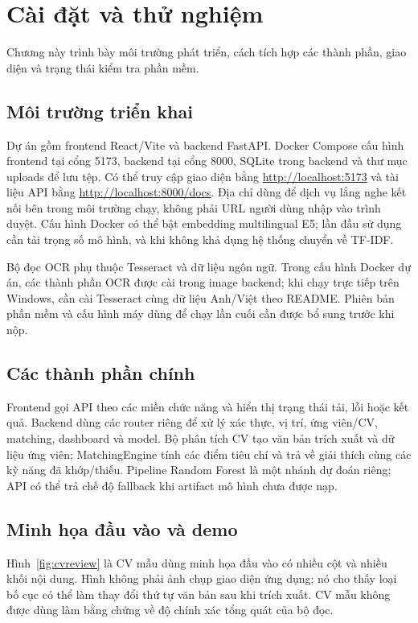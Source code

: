 \chapter{Cài đặt và thử nghiệm}
\label{ch:caidat}

\begin{muctieu}
Chương này trình bày môi trường phát triển, cách tích hợp các thành phần, giao diện và trạng thái kiểm tra phần mềm.
\end{muctieu}

\section{Môi trường triển khai}
Dự án gồm frontend React/Vite và backend FastAPI. Docker Compose cấu hình frontend tại cổng 5173, backend tại cổng 8000, SQLite trong backend và thư mục uploads để lưu tệp. Có thể truy cập giao diện bằng \url{http://localhost:5173} và tài liệu API bằng \url{http://localhost:8000/docs}. Địa chỉ  dùng để dịch vụ lắng nghe kết nối bên trong môi trường chạy, không phải URL người dùng nhập vào trình duyệt. Cấu hình Docker có thể bật embedding multilingual E5; lần đầu sử dụng cần tải trọng số mô hình, và khi không khả dụng hệ thống chuyển về TF-IDF.

Bộ đọc OCR phụ thuộc Tesseract và dữ liệu ngôn ngữ. Trong cấu hình Docker dự án, các thành phần OCR được cài trong image backend; khi chạy trực tiếp trên Windows, cần cài Tesseract cùng dữ liệu Anh/Việt theo README. Phiên bản phần mềm và cấu hình máy dùng để chạy lần cuối cần được bổ sung trước khi nộp.

\section{Các thành phần chính}
Frontend gọi API theo các miền chức năng và hiển thị trạng thái tải, lỗi hoặc kết quả. Backend dùng các router riêng để xử lý xác thực, vị trí, ứng viên/CV, matching, dashboard và model. Bộ phân tích CV tạo văn bản trích xuất và dữ liệu ứng viên; MatchingEngine tính các điểm tiêu chí và trả về giải thích cùng các kỹ năng đã khớp/thiếu. Pipeline Random Forest là một nhánh dự đoán riêng; API có thể trả chế độ fallback khi artifact mô hình chưa được nạp.

\section{Minh họa đầu vào và demo}
Hình~\ref{fig:cvreview} là CV mẫu dùng minh họa đầu vào có nhiều cột và nhiều khối nội dung. Hình không phải ảnh chụp giao diện ứng dụng; nó cho thấy loại bố cục có thể làm thay đổi thứ tự văn bản sau khi trích xuất. CV mẫu không được dùng làm bằng chứng về độ chính xác tổng quát của bộ đọc.

